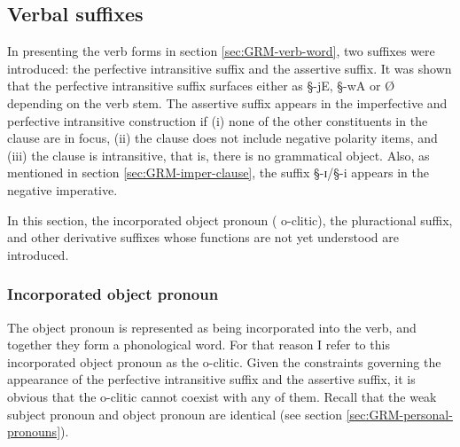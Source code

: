 







\subsection{Verbal suffixes}
\label{sec:GRM-verb-suffix}


In presenting the verb forms in section \ref{sec:GRM-verb-word}, two suffixes
were introduced: the perfective intransitive suffix and the assertive suffix. It
was shown that the perfective intransitive suffix surfaces either as {\S -jE},
{\S -wA} or {\O} depending on  the verb stem.  The assertive suffix
appears  in the imperfective and perfective  intransitive construction if  (i)
none of the other constituents in the clause are in focus, (ii) the clause does
not include negative polarity items, and (iii) the clause is intransitive, that
is, there is no grammatical object. Also,  as mentioned in section
\ref{sec:GRM-imper-clause},  the suffix {\S -ɪ}/{\S -i} appears in the negative
imperative. 

In this section,  the incorporated object pronoun  ({\sc
o}-clitic), the pluractional  suffix, and  other derivative suffixes whose
functions are not yet understood are introduced.


\subsubsection{Incorporated object pronoun}
\label{sec:GRM-morph-opro}


The object pronoun  is
represented as being incorporated into the verb,  and  together they form a
phonological word.  For that reason I refer to this
incorporated object pronoun as the {\sc
o}-clitic. Given the constraints governing the appearance of the perfective
intransitive suffix and the assertive suffix, it is obvious that the {\sc
o}-clitic cannot coexist with any of them. Recall that the  weak subject
pronoun 
and object  pronoun are identical (see section
\ref{sec:GRM-personal-pronouns}).


